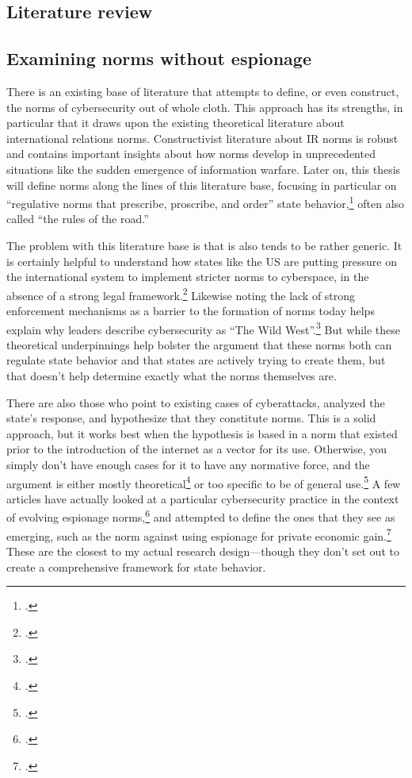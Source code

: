 \documentclass{memoir}
\begin{document}
\begin{refsegment}
\section{Literature review}
\subsection{Examining norms without espionage}
There is an existing base of literature that attempts to define, or even construct, the norms of cybersecurity out of whole cloth. This approach has its strengths, in particular that it draws upon the existing theoretical literature about international relations norms. Constructivist literature about IR norms is robust and contains important insights about how norms develop in unprecedented situations like the sudden emergence of information warfare. Later on, this thesis will define norms along the lines of this literature base, focusing in particular on ``regulative norms that prescribe, proscribe, and order'' state behavior,\footcite{bjorkdahl_norms_2002} often also called ``the rules of the road.''

The problem with this literature base is that is also tends to be rather generic. It is certainly helpful to understand how states like the US are putting pressure on the international system to implement stricter norms to cyberspace, in the absence of a strong legal framework.\footcite[~p.7]{finnemore_constructing_2016} Likewise noting the lack of strong enforcement mechanisms as a barrier to the formation of norms today helps explain why leaders describe cybersecurity as ``The Wild West''.\footcite{iasiello_what_2016} But while these theoretical underpinnings help bolster the argument that these norms both can regulate state behavior and that states are actively trying to create them, but that doesn't help determine exactly what the norms themselves are.

There are also those who point to existing cases of cyberattacks, analyzed the state's response, and hypothesize that they constitute norms. This is a solid approach, but it works best when the hypothesis is based in a norm that existed prior to the introduction of the internet as a vector for its use. Otherwise, you simply don't have enough cases for it to have any normative force, and the argument is either mostly theoretical\footcite{neutze_cyber_2013} or too specific to be of general use.\footcite{caso_rules_2014} A few articles have actually looked at a particular cybersecurity practice in the context of evolving espionage norms,\footcite{libicki_coming_2017} and attempted to define the ones that they see as emerging, such as the norm against using espionage for private economic gain.\footcite{rascoff_norm_2016} These are the closest to my actual research design---though they don't set out to create a comprehensive framework for state behavior.


\end{refsegment}
\end{document}
